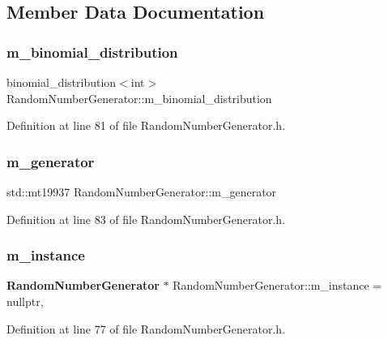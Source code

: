\subsection{Member Data Documentation}
\mbox{\label{class_random_number_generator_a0669afa8b2ad0fd544f140e294ce581f}} 
\subsubsection{m\_binomial\_distribution}
{\footnotesize\ttfamily binomial\+\_\+distribution$<$int$>$ Random\+Number\+Generator\+::m\+\_\+binomial\+\_\+distribution\hspace{0.3cm}{\ttfamily [private]}}



Definition at line 81 of file Random\+Number\+Generator.\+h.

\mbox{\label{class_random_number_generator_a2fd6f5958a3c4500beee344d6af66a39}} 
\subsubsection{m\_generator}
{\footnotesize\ttfamily std\+::mt19937 Random\+Number\+Generator\+::m\+\_\+generator\hspace{0.3cm}{\ttfamily [private]}}



Definition at line 83 of file Random\+Number\+Generator.\+h.

\mbox{\label{class_random_number_generator_afc1016b96e967d0fad1d3ee4e99f638e}} 
\subsubsection{m\_instance}
{\footnotesize\ttfamily \textbf{ Random\+Number\+Generator} $\ast$ Random\+Number\+Generator\+::m\+\_\+instance = nullptr\hspace{0.3cm}{\ttfamily [static]}, {\ttfamily [private]}}



Definition at line 77 of file Random\+Number\+Generator.\+h.

